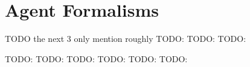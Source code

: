 \section{Agent Formalisms}
TODO the next 3 only mention roughly
TODO: \cite{wooldridge_introduction_2009}
TODO: \cite{wooldridge_intelligent_1995}
TODO: \cite{weiss_multiagent_2013}

TODO: \cite{klugl_amason:_2013}
TODO: \cite{jennings_agent-based_2000}
TODO: \cite{lerman_design_2000}
TODO: \cite{dinverno_formal_2000}
TODO: \cite{araragi_formal_2000}
TODO: \cite{carchiolo_using_2000}